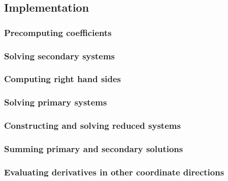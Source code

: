     \subsection{Implementation}
        \subsubsection{Precomputing coefficients}
        \subsubsection{Solving secondary systems}
        \subsubsection{Computing right hand sides}
        \subsubsection{Solving primary systems}
        \subsubsection{Constructing and solving reduced systems}
        \subsubsection{Summing primary and secondary solutions}
        \subsubsection{Evaluating derivatives in other
            coordinate directions}
